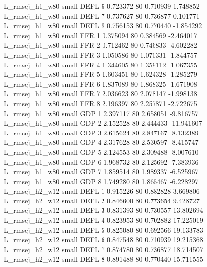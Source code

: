 L_rmsej_h1_w80      small     DEFL                 6 0.723372 80       0.710939           1.748852
L_rmsej_h1_w80      small     DEFL                 7 0.737627 80       0.736877           0.101771
L_rmsej_h1_w80      small     DEFL                 8 0.756153 80       0.770440          -1.854292
L_rmsej_h1_w80      small      FFR                 1 0.375094 80       0.384569          -2.464017
L_rmsej_h1_w80      small      FFR                 2 0.712462 80       0.746833          -4.602282
L_rmsej_h1_w80      small      FFR                 3 1.050586 80       1.070331          -1.844757
L_rmsej_h1_w80      small      FFR                 4 1.344605 80       1.359112          -1.067355
L_rmsej_h1_w80      small      FFR                 5 1.603451 80       1.624328          -1.285279
L_rmsej_h1_w80      small      FFR                 6 1.837089 80       1.868325          -1.671908
L_rmsej_h1_w80      small      FFR                 7 2.036623 80       2.078147          -1.998138
L_rmsej_h1_w80      small      FFR                 8 2.196397 80       2.257871          -2.722675
L_rmsej_h1_w80      small      GDP                 1 2.397117 80       2.658051          -9.816757
L_rmsej_h1_w80      small      GDP                 2 2.152528 80       2.444433         -11.941607
L_rmsej_h1_w80      small      GDP                 3 2.615624 80       2.847167          -8.132389
L_rmsej_h1_w80      small      GDP                 4 2.317628 80       2.530597          -8.415747
L_rmsej_h1_w80      small      GDP                 5 2.124553 80       2.309488          -8.007610
L_rmsej_h1_w80      small      GDP                 6 1.968732 80       2.125692          -7.383936
L_rmsej_h1_w80      small      GDP                 7 1.859514 80       1.989337          -6.525967
L_rmsej_h1_w80      small      GDP                 8 1.749280 80       1.865467          -6.228297
L_rmsej_h2_w12      small     DEFL                 1 0.915226 80       0.882828           3.669806
L_rmsej_h2_w12      small     DEFL                 2 0.846600 80       0.773654           9.428727
L_rmsej_h2_w12      small     DEFL                 3 0.831393 80       0.730557          13.802694
L_rmsej_h2_w12      small     DEFL                 4 0.823953 80       0.702882          17.225019
L_rmsej_h2_w12      small     DEFL                 5 0.825080 80       0.692566          19.133783
L_rmsej_h2_w12      small     DEFL                 6 0.847548 80       0.710939          19.215368
L_rmsej_h2_w12      small     DEFL                 7 0.874780 80       0.736877          18.714507
L_rmsej_h2_w12      small     DEFL                 8 0.891488 80       0.770440          15.711555
